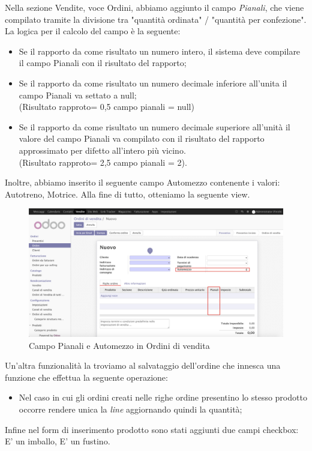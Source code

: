 Nella sezione Vendite, voce Ordini, abbiamo aggiunto il campo \textit{Pianali}, che viene compilato tramite la divisione tra "quantità ordinata" / "quantità per confezione".
La logica per il calcolo del campo è la seguente:
\begin{itemize}
	\item Se il rapporto da come risultato un numero intero, il sistema deve compilare il campo Pianali con il risultato del rapporto;
	\item Se il rapporto da come risultato un numero decimale inferiore all'unita il campo Pianali va settato a null;
	\\ (Risultato rapproto= 0,5 campo pianali = null)
	\item Se il rapporto da come risultato un numero decimale superiore all'unità il valore del campo Pianali va compilato con il risultato del rapporto approssimato per difetto all'intero più vicino. \\
	(Risultato rapproto= 2,5 campo pianali = 2).
\end{itemize}
Inoltre, abbiamo inserito il seguente campo Automezzo contenente i valori: Autotreno, Motrice. Alla fine di tutto, otteniamo la seguente view.
\vspace*{0.5cm}
\begin{figure}[H]
	\begin{center} \includegraphics[scale=0.3]{figures/pianali}
		\caption[Campo Pianali e Automezzo in Ordini di vendita]{Campo Pianali e Automezzo in Ordini di vendita}
		\label{fig:pianali}
	\end{center}
\end{figure}

Un'altra funzionalità la troviamo al salvataggio dell'ordine che innesca una funzione che effettua la seguente operazione:
\begin{itemize}
\item Nel caso in cui gli ordini creati nelle righe ordine presentino lo stesso prodotto occorre rendere unica la \textit{line} aggiornando quindi la quantità;
\end{itemize}
\newpage
Infine nel form di inserimento prodotto sono stati aggiunti due campi checkbox: E' un imballo, E' un fustino.

